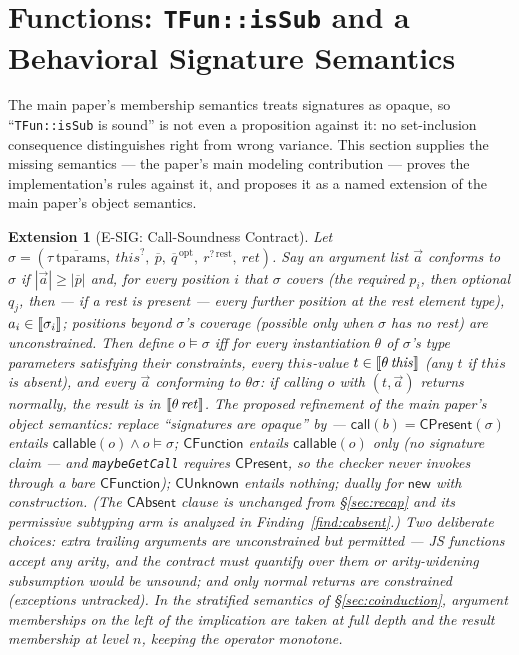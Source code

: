 \documentclass[11pt]{article}
\newtheorem{extension}[theorem]{Extension}
\begin{document}
\section{Functions: \texttt{TFun::isSub} and a Behavioral Signature
Semantics}
\label{sec:tfun}

The main paper's membership semantics treats signatures as opaque, so
``\texttt{TFun::isSub} is sound'' is not even a proposition against it:
no set-inclusion consequence distinguishes right from wrong variance.
This section supplies the missing semantics --- the paper's main modeling
contribution --- proves the implementation's rules against it, and
proposes it as a named extension of the main paper's object semantics.

\begin{extension}[E-SIG: Call-Soundness Contract]
\label{ext:esig}
Let $\sigma = (\overline{\tau\ \mathrm{tparams}},\ \mathit{this}^?,\
\overline{p},\ \overline{q}^{\,\mathrm{opt}},\ r^{?\,\mathrm{rest}},\
\mathit{ret})$. Say an argument list $\vec{a}$ \emph{conforms to}
$\sigma$ if $|\vec{a}| \geq |\overline{p}|$ and, for every position $i$
that $\sigma$ \emph{covers} (the required $p_i$, then optional $q_j$,
then --- if a rest is present --- every further position at the rest
element type), $a_i \in \llbracket \sigma_i \rrbracket$; positions \emph{beyond}
$\sigma$'s coverage (possible only when $\sigma$ has no rest) are
unconstrained. Then define $o \vDash \sigma$ iff for every instantiation
$\theta$ of $\sigma$'s type parameters satisfying their constraints,
every $\mathit{this}$-value $t \in \llbracket \theta\,\mathit{this} \rrbracket$ (any $t$
if $\mathit{this}$ is absent), and every $\vec{a}$ conforming to
$\theta\sigma$: if calling $o$ with $(t, \vec{a})$ returns normally, the
result is in $\llbracket \theta\,\mathit{ret} \rrbracket$. The proposed refinement of
the main paper's object semantics: replace ``signatures are opaque'' by
--- $\mathsf{call}(b) = \mathsf{CPresent}(\sigma)$ entails
$\mathsf{callable}(o) \wedge o \vDash \sigma$;
$\mathsf{CFunction}$ entails $\mathsf{callable}(o)$ only (no signature
claim --- and \texttt{maybeGetCall} requires $\mathsf{CPresent}$, so the
checker never invokes through a bare $\mathsf{CFunction}$);
$\mathsf{CUnknown}$ entails nothing; dually for
$\mathsf{new}$ with construction. (The $\mathsf{CAbsent}$ clause is
unchanged from \S\ref{sec:recap} and its permissive subtyping arm is analyzed in
Finding~\ref{find:cabsent}.) Two deliberate choices:
extra trailing arguments are \emph{unconstrained but permitted} ---
JS functions accept any arity, and the contract must quantify over them
or arity-widening subsumption would be unsound; and only normal returns
are constrained (exceptions untracked). In the stratified semantics of
\S\ref{sec:coinduction}, argument memberships on the left of the
implication are taken at full depth and the result membership at level
$n$, keeping the operator monotone.
\end{extension}
\end{document}
